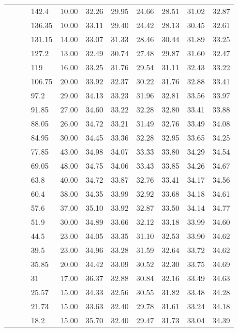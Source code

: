 \begin{longtable}{llllrrrrrrr}
   &  &  & 142.4 & 10.00 & 32.26 & 29.95 & 24.66 & 28.51 & 31.02 & 32.87 \\ 
   &  &  & 136.35 & 10.00 & 33.11 & 29.40 & 24.42 & 28.13 & 30.45 & 32.61 \\ 
   &  &  & 131.15 & 14.00 & 33.07 & 31.33 & 28.46 & 30.44 & 31.89 & 33.25 \\ 
   &  &  & 127.2 & 13.00 & 32.49 & 30.74 & 27.48 & 29.87 & 31.60 & 32.47 \\ 
   &  &  & 119 & 16.00 & 33.25 & 31.76 & 29.54 & 31.11 & 32.43 & 33.22 \\ 
   &  &  & 106.75 & 20.00 & 33.92 & 32.37 & 30.22 & 31.76 & 32.88 & 33.41 \\ 
   &  &  & 97.2 & 29.00 & 34.13 & 33.23 & 31.96 & 32.81 & 33.56 & 33.97 \\ 
   &  &  & 91.85 & 27.00 & 34.60 & 33.22 & 32.28 & 32.80 & 33.41 & 33.88 \\ 
   &  &  & 88.05 & 26.00 & 34.72 & 33.21 & 31.49 & 32.76 & 33.49 & 34.08 \\ 
   &  &  & 84.95 & 30.00 & 34.45 & 33.36 & 32.28 & 32.95 & 33.65 & 34.25 \\ 
   &  &  & 77.85 & 43.00 & 34.98 & 34.07 & 33.33 & 33.80 & 34.29 & 34.54 \\ 
   &  &  & 69.05 & 48.00 & 34.75 & 34.06 & 33.43 & 33.85 & 34.26 & 34.67 \\ 
   &  &  & 63.8 & 40.00 & 34.72 & 33.87 & 32.76 & 33.41 & 34.17 & 34.56 \\ 
   &  &  & 60.4 & 38.00 & 34.35 & 33.99 & 32.92 & 33.68 & 34.18 & 34.61 \\ 
   &  &  & 57.6 & 37.00 & 35.10 & 33.92 & 32.87 & 33.50 & 34.14 & 34.77 \\ 
   &  &  & 51.9 & 30.00 & 34.89 & 33.66 & 32.12 & 33.18 & 33.99 & 34.60 \\ 
   &  &  & 44.5 & 23.00 & 34.05 & 33.35 & 31.10 & 32.53 & 33.90 & 34.62 \\ 
   &  &  & 39.5 & 23.00 & 34.96 & 33.28 & 31.59 & 32.64 & 33.72 & 34.62 \\ 
   &  &  & 35.85 & 20.00 & 34.42 & 33.09 & 30.52 & 32.30 & 33.75 & 34.69 \\ 
   &  &  & 31 & 17.00 & 36.37 & 32.88 & 30.84 & 32.16 & 33.49 & 34.63 \\ 
   &  &  & 25.57 & 15.00 & 34.33 & 32.56 & 30.55 & 31.82 & 33.48 & 34.28 \\ 
   &  &  & 21.73 & 15.00 & 33.63 & 32.40 & 29.78 & 31.61 & 33.24 & 34.18 \\ 
   &  &  & 18.2 & 15.00 & 35.70 & 32.40 & 29.47 & 31.73 & 33.04 & 34.39 \\ 

\end{longtable}
